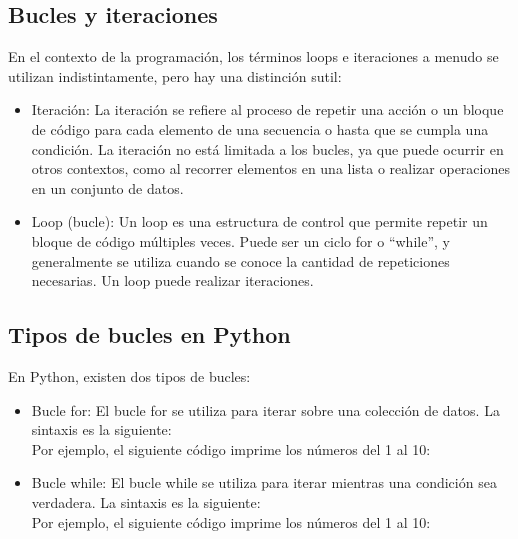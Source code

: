 \subsection{Bucles y iteraciones}
En el contexto de la programación, los términos loops e iteraciones a menudo se utilizan indistintamente, pero hay una distinción sutil:

\begin{itemize}
    \item Iteración: La iteración se refiere al proceso de repetir una acción o un bloque de código para cada elemento de una secuencia o hasta que se cumpla una condición. La iteración no está limitada a los bucles, ya que puede ocurrir en otros contextos, como al recorrer elementos en una lista o realizar operaciones en un conjunto de datos.
    \item Loop (bucle): Un loop es una estructura de control que permite repetir un bloque de código múltiples veces. Puede ser un ciclo for o ``while'', y generalmente se utiliza cuando se conoce la cantidad de repeticiones necesarias. Un loop puede realizar iteraciones.
\end{itemize}

\subsection{Tipos de bucles en Python}
En Python, existen dos tipos de bucles:
\begin{itemize}
    \item Bucle for: El bucle for se utiliza para iterar sobre una colección de datos. La sintaxis es la siguiente: \\ Por ejemplo, el siguiente código imprime los números del 1 al 10:
    \item Bucle while: El bucle while se utiliza para iterar mientras una condición sea verdadera. La sintaxis es la siguiente:\\ Por ejemplo, el siguiente código imprime los números del 1 al 10:
\end{itemize}